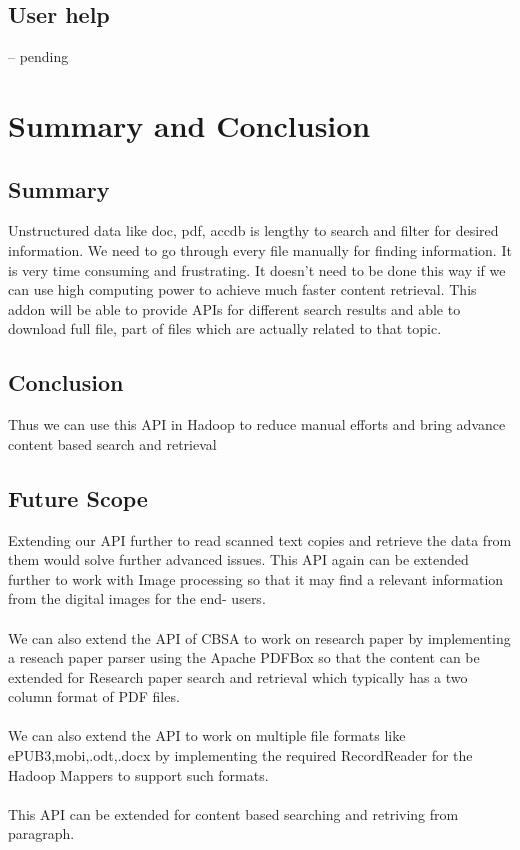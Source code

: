 \documentclass[oneside,a4paper,12pt]{report}
\begin{document}
{\section{User help}
-- pending 

\chapter{Summary and Conclusion}
\section{Summary}
Unstructured data like doc, pdf, accdb is lengthy to search and filter for desired information. We need to go through every file manually for finding information. It is very time consuming and frustrating. It doesn’t need to be done this way if we can use high computing power to achieve much faster content retrieval. This addon will be able to provide APIs for different search results and able to download full file, part of files which are actually related to that topic. 

\section{Conclusion}
Thus we can use this API in Hadoop to reduce manual efforts and bring advance content based search and retrieval

\section{Future Scope}
Extending our API further to read scanned text copies and retrieve the data from them would solve further advanced issues. This API again can be extended further to work with Image processing so that it may find a relevant information from the digital images for the end- users.\\\\
We can also extend the API of CBSA to work on research paper by implementing a reseach paper parser using the Apache PDFBox so that the content can be extended for Research paper search and retrieval which typically has a two column format of PDF files.\\\\
We can also extend the API to work on multiple file formats like ePUB3,mobi,.odt,.docx by implementing the required RecordReader for the Hadoop Mappers to support such formats.\\\\
This API can be extended for content based searching and retriving from paragraph.


}
\end{document}
